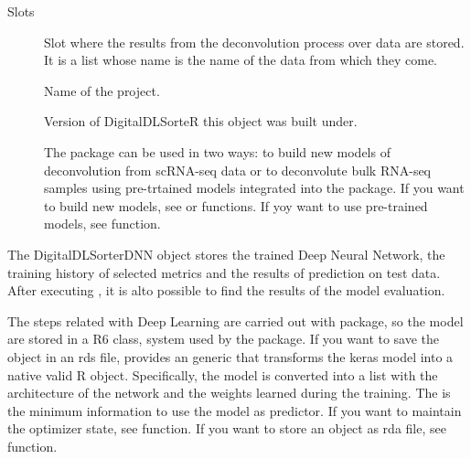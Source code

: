 \documentclass[a4paper]{book}
\begin{document}
\begin{Section}{Slots}
\begin{description}
\item[] Slot where the results from the deconvolution process
over  data are stored. It is a list whose name is
the name of the data from which they come.

\item[] Name of the project.

\item[] Version of DigitalDLSorteR this object was built under.

The package can be used in two ways: to build new models of deconvolution
from scRNA-seq data or to deconvolute bulk RNA-seq samples using
pre-trtained models integrated into the package. If you want to build new
models, see  or
 functions. If yoy want to use pre-trained
models, see  function.

\end{description}
\end{Section}
%
\begin{Description}\relax
The DigitalDLSorterDNN object stores the trained Deep Neural Network, the
training history of selected metrics and the results of prediction on test
data. After executing , it is alto possible
to find the results of the model evaluation.
\end{Description}
%
\begin{Details}\relax
The steps related with Deep Learning are carried out with 
package, so the model are stored in a R6 class, system used by the package.
If you want to save the object in an rds file, 
provides an  generic that transforms the keras model into a
native valid R object. Specifically, the model is converted into a list with
the architecture of the network and the weights learned during the training.
The is the minimum information to use the model as predictor. If you want to
maintain the optimizer state, see 
function. If you want to store an object as rda file, see
 function.
\end{Details}
\end{document}
